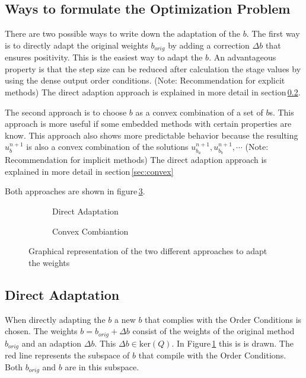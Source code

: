 \documentclass{article}
\begin{document}
\subsection{Ways to formulate the Optimization Problem}

There are two possible ways to write down the adaptation of the $b$. The first way is to directly adapt the original weights $b_{orig}$ by adding a correction $\Delta b$ that ensures positivity.
This is the easiest way to adapt the $b$. An advantageous property is that the step size can be reduced after calculation the stage values by using the dense output order conditions.  
(Note: Recommendation for explicit methods)
The direct adaption approach is explained in more detail in section\,\ref{sec:direct}.

The second approach is to choose $b$ as a convex combination of a set of $b$s. This approach is more useful if some embedded methods with certain properties are know. 
This approach also shows more  predictable behavior because the resulting $u^{n+1}_b$ is also a convex combination of the solutions $u^{n+1}_{b_a},u^{n+1}_{b_b},\cdots$ 
(Note: Recommendation for implicit methods)
The direct adaption approach is explained in more detail in section\,\ref{sec:convex}

Both approaches are shown in figure\,\ref{fig:b_space}.


\begin{figure}
    \centering
    \begin{subfigure}[b]{0.45\textwidth}
        
        \caption{Direct Adaptation}
        \label{fig:b_direct}
    \end{subfigure}
    \begin{subfigure}[b]{0.45\textwidth}
        
        \caption{Convex Combiantion}
        \label{fig:b_convex}
    \end{subfigure}
    \caption{Graphical representation of the two different approaches to adapt the weights}\label{fig:b_space}
\end{figure}

\subsection{Direct Adaptation}\label{sec:direct}

When directly adapting the $b$ a new $b$ that complies with the Order Conditions is chosen.   
The weights $b = b_{orig} + \Delta b$ consist of the weights of the original method $b_{orig}$ and an adaption $\Delta b$. This $\Delta b \in \mathrm{ker}(Q)$. 
In Figure\,\ref{fig:b_direct} this is is drawn. The red line represents the subspace of $b$ that compile with the Order Conditions. Both $b_{orig}$ and $b$ are in this subspace. 
 
\end{document}
